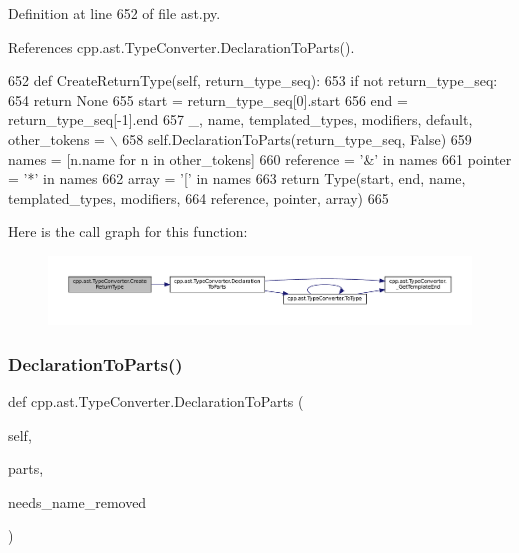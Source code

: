 Definition at line 652 of file ast.\+py.



References cpp.\+ast.\+Type\+Converter.\+Declaration\+To\+Parts().


\begin{DoxyCode}
652     \textcolor{keyword}{def }CreateReturnType(self, return\_type\_seq):
653         \textcolor{keywordflow}{if} \textcolor{keywordflow}{not} return\_type\_seq:
654             \textcolor{keywordflow}{return} \textcolor{keywordtype}{None}
655         start = return\_type\_seq[0].start
656         end = return\_type\_seq[-1].end
657         \_, name, templated\_types, modifiers, default, other\_tokens = \(\backslash\)
658            self.DeclarationToParts(return\_type\_seq, \textcolor{keyword}{False})
659         names = [n.name \textcolor{keywordflow}{for} n \textcolor{keywordflow}{in} other\_tokens]
660         reference = \textcolor{stringliteral}{'&'} \textcolor{keywordflow}{in} names
661         pointer = \textcolor{stringliteral}{'*'} \textcolor{keywordflow}{in} names
662         array = \textcolor{stringliteral}{'['} \textcolor{keywordflow}{in} names
663         \textcolor{keywordflow}{return} Type(start, end, name, templated\_types, modifiers,
664                     reference, pointer, array)
665 
\end{DoxyCode}
Here is the call graph for this function\+:
\nopagebreak
\begin{figure}[H]
\begin{center}
\leavevmode
\includegraphics[width=350pt]{classcpp_1_1ast_1_1TypeConverter_a7e4d429131d9d5742ec44c78b61beb87_cgraph}
\end{center}
\end{figure}
\mbox{\label{classcpp_1_1ast_1_1TypeConverter_a7c9d20d107c2bc0eb80afdf04957825f}} 
\subsubsection{\texorpdfstring{Declaration\+To\+Parts()}{DeclarationToParts()}}
{\footnotesize\ttfamily def cpp.\+ast.\+Type\+Converter.\+Declaration\+To\+Parts (\begin{DoxyParamCaption}\item[{}]{self,  }\item[{}]{parts,  }\item[{}]{needs\+\_\+name\+\_\+removed }\end{DoxyParamCaption})}



